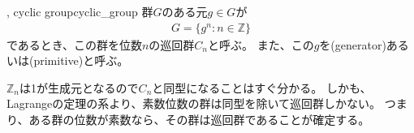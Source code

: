 \begin{Defi}{, cyclic group}{cyclic_group}
群$G$のある元$g\in G$が
\begin{align*}
G = \{g^n : n \in \mathbb{Z}\}
\end{align*}
であるとき、この群を位数$n$の巡回群$C_n$と呼ぶ。
また、この$g$を(generator)あるいは(primitive)と呼ぶ。
\end{Defi}

$\mathbb{Z}_n$は1が生成元となるので$C_n$と同型になることはすぐ分かる。
しかも、Lagrangeの定理の系より、素数位数の群は同型を除いて巡回群しかない。
つまり、ある群の位数が素数なら、その群は巡回群であることが確定する。

